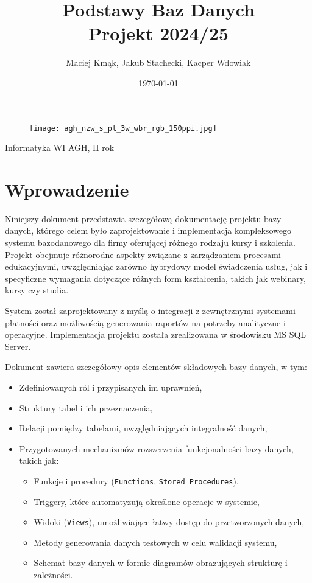 \documentclass[12pt]{article}
\title{%
  \textbf{\Huge Podstawy Baz Danych} \\ 
  \LARGE Projekt  2024/25}
\author{Maciej Kmąk, Jakub Stachecki, Kacper Wdowiak}
\date{\today}
\begin{document}
\begin{figure}
    \centering
    \texttt{[image: agh\_nzw\_s\_pl\_3w\_wbr\_rgb\_150ppi.jpg]}
    \label{fig:agh}
\end{figure}
\maketitle

{\centering \Large\theauthor\par}
{\centering
Informatyka WI AGH, II rok \\ } 

\thispagestyle{plain}

\newpage
\pagestyle{spis}
\tableofcontents

\newpage
\pagestyle{dokumentacja}
\section{Wprowadzenie}

Niniejszy dokument przedstawia szczegółową dokumentację projektu bazy danych, którego celem było zaprojektowanie i implementacja kompleksowego systemu bazodanowego dla firmy oferującej różnego rodzaju kursy i szkolenia. Projekt obejmuje różnorodne aspekty związane z zarządzaniem procesami edukacyjnymi, uwzględniając zarówno hybrydowy model świadczenia usług, jak i specyficzne wymagania dotyczące różnych form kształcenia, takich jak webinary, kursy czy studia.

\noindent System został zaprojektowany z myślą o integracji z zewnętrznymi systemami płatności oraz możliwością generowania raportów na potrzeby analityczne i operacyjne. Implementacja projektu została zrealizowana w środowisku MS SQL Server.

\noindent Dokument zawiera szczegółowy opis elementów składowych bazy danych, w tym: \begin{itemize} 
\item Zdefiniowanych ról i przypisanych im uprawnień, 
\item Struktury tabel i ich przeznaczenia, 
\item Relacji pomiędzy tabelami, uwzględniających integralność danych, 
\item Przygotowanych mechanizmów rozszerzenia funkcjonalności bazy danych, takich jak: \begin{itemize} 
        \item Funkcje i procedury (\texttt{Functions}, \texttt{Stored Procedures}),
        \item Triggery, które automatyzują określone operacje w systemie, 
        \item Widoki (\texttt{Views}), umożliwiające łatwy dostęp do przetworzonych danych, 
        \item Metody generowania danych testowych w celu walidacji systemu, 
        \item Schemat bazy danych w formie diagramów obrazujących strukturę i zależności. 
    \end{itemize} 
\end{itemize}
\end{document}
